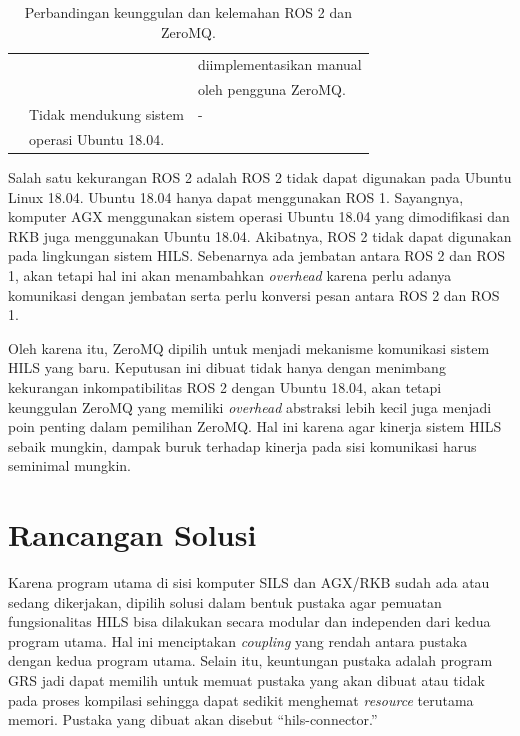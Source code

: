 \begin{table}[!htbp]
\begin{tabular}{| r | l | l |}
		                    &                                    & diimplementasikan manual                           \\
		                    &                                    & oleh pengguna ZeroMQ.                              \\
		\cline{2-3}
		                    & Tidak mendukung sistem             & -                                                  \\
		                    & operasi Ubuntu 18.04.              &                                                    \\
		\hline
	\end{tabular}
	\label{chapter-3-tbl-ros2-vs-zmq}
	\caption{Perbandingan keunggulan dan kelemahan ROS 2 dan ZeroMQ.}
\end{table}

Salah satu kekurangan ROS 2 adalah ROS 2 tidak dapat digunakan pada Ubuntu Linux
18.04. Ubuntu 18.04 hanya dapat menggunakan ROS 1. Sayangnya, komputer AGX
menggunakan sistem operasi Ubuntu 18.04 yang dimodifikasi dan RKB juga
menggunakan Ubuntu 18.04. Akibatnya, ROS 2 tidak dapat digunakan pada lingkungan
sistem HILS. Sebenarnya ada jembatan antara ROS 2 dan ROS 1, akan tetapi hal
ini akan menambahkan \textit{overhead} karena perlu adanya komunikasi dengan
jembatan serta perlu konversi pesan antara ROS 2 dan ROS 1.

Oleh karena itu, ZeroMQ dipilih untuk menjadi mekanisme komunikasi sistem HILS
yang baru. Keputusan ini dibuat tidak hanya dengan menimbang kekurangan
inkompatibilitas ROS 2 dengan Ubuntu 18.04, akan tetapi keunggulan ZeroMQ yang
memiliki \textit{overhead} abstraksi lebih kecil juga menjadi poin penting dalam
pemilihan ZeroMQ. Hal ini karena agar kinerja sistem HILS sebaik mungkin,
dampak buruk terhadap kinerja pada sisi komunikasi harus seminimal mungkin.

\section{Rancangan Solusi}

Karena program utama di sisi komputer SILS dan AGX/RKB sudah ada atau sedang
dikerjakan, dipilih solusi dalam bentuk pustaka agar pemuatan fungsionalitas
HILS bisa dilakukan secara modular dan independen dari kedua program utama.
Hal ini menciptakan \textit{coupling} yang rendah antara pustaka dengan kedua
program utama. Selain itu, keuntungan pustaka adalah program GRS jadi dapat
memilih untuk memuat pustaka yang akan dibuat atau tidak pada proses kompilasi
sehingga dapat sedikit menghemat \textit{resource} terutama memori. Pustaka yang
dibuat akan disebut ``hils-connector.''

